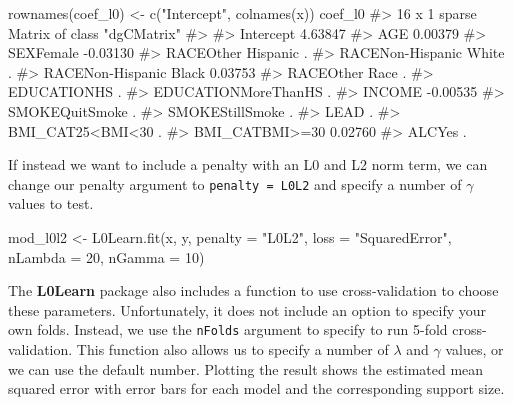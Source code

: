 \documentclass[
  letterpaper,
]{latex/krantz}
\makeatletter
\newenvironment{Shaded}{\begin{snugshade}}{\end{snugshade}}
\newcommand{\AttributeTok}[1]{\textcolor[rgb]{0.40,0.45,0.13}{#1}}
\newcommand{\CommentTok}[1]{\textcolor[rgb]{0.37,0.37,0.37}{#1}}
\newcommand{\DecValTok}[1]{\textcolor[rgb]{0.68,0.00,0.00}{#1}}
\newcommand{\FunctionTok}[1]{\textcolor[rgb]{0.28,0.35,0.67}{#1}}
\newcommand{\NormalTok}[1]{\textcolor[rgb]{0.00,0.23,0.31}{#1}}
\newcommand{\OtherTok}[1]{\textcolor[rgb]{0.00,0.23,0.31}{#1}}
\newcommand{\StringTok}[1]{\textcolor[rgb]{0.13,0.47,0.30}{#1}}
\newenvironment{kframe}{%
\medskip{}
\setlength{\fboxsep}{.8em}
 \def\at@end@of@kframe{}%
 \ifinner\ifhmode%
  \def\at@end@of@kframe{\end{minipage}}%
  \begin{minipage}{\columnwidth}%
 \fi\fi%
 \def\FrameCommand##1{\hskip\@totalleftmargin \hskip-\fboxsep
 \colorbox{shadecolor}{##1}\hskip-\fboxsep
     \hskip-\linewidth \hskip-\@totalleftmargin \hskip\columnwidth}%
 \MakeFramed {\advance\hsize-\width
   \@totalleftmargin\z@ \linewidth\hsize
   \@setminipage}}%
 {\par\unskip\endMakeFramed%
 \at@end@of@kframe}
\renewenvironment{Shaded}{\begin{kframe}}{\end{kframe}}
\makeatother
\begin{document}
\begin{Shaded}
\begin{Highlighting}[]
\FunctionTok{rownames}\NormalTok{(coef\_l0) }\OtherTok{\textless{}{-}} \FunctionTok{c}\NormalTok{(}\StringTok{"Intercept"}\NormalTok{, }\FunctionTok{colnames}\NormalTok{(x))}
\NormalTok{coef\_l0}
\CommentTok{\#\textgreater{} 16 x 1 sparse Matrix of class "dgCMatrix"}
\CommentTok{\#\textgreater{}                                }
\CommentTok{\#\textgreater{} Intercept               4.63847}
\CommentTok{\#\textgreater{} AGE                     0.00379}
\CommentTok{\#\textgreater{} SEXFemale              {-}0.03130}
\CommentTok{\#\textgreater{} RACEOther Hispanic      .      }
\CommentTok{\#\textgreater{} RACENon{-}Hispanic White  .      }
\CommentTok{\#\textgreater{} RACENon{-}Hispanic Black  0.03753}
\CommentTok{\#\textgreater{} RACEOther Race          .      }
\CommentTok{\#\textgreater{} EDUCATIONHS             .      }
\CommentTok{\#\textgreater{} EDUCATIONMoreThanHS     .      }
\CommentTok{\#\textgreater{} INCOME                 {-}0.00535}
\CommentTok{\#\textgreater{} SMOKEQuitSmoke          .      }
\CommentTok{\#\textgreater{} SMOKEStillSmoke         .      }
\CommentTok{\#\textgreater{} LEAD                    .      }
\CommentTok{\#\textgreater{} BMI\_CAT25\textless{}BMI\textless{}30        .      }
\CommentTok{\#\textgreater{} BMI\_CATBMI\textgreater{}=30          0.02760}
\CommentTok{\#\textgreater{} ALCYes                  .}
\end{Highlighting}
\end{Shaded}

If instead we want to include a penalty with an L0 and L2 norm term, we
can change our penalty argument to \texttt{penalty\ =\ L0L2} and specify
a number of \(\gamma\) values to test.

\begin{Shaded}
\begin{Highlighting}[]
\NormalTok{mod\_l0l2 }\OtherTok{\textless{}{-}} \FunctionTok{L0Learn.fit}\NormalTok{(x, y, }\AttributeTok{penalty =} \StringTok{"L0L2"}\NormalTok{, }
                        \AttributeTok{loss =} \StringTok{"SquaredError"}\NormalTok{,}
                        \AttributeTok{nLambda =} \DecValTok{20}\NormalTok{, }\AttributeTok{nGamma =} \DecValTok{10}\NormalTok{)}
\end{Highlighting}
\end{Shaded}

The \textbf{L0Learn} package also includes a function to use
cross-validation
to choose these parameters. Unfortunately, it does not include an option
to specify your own folds. Instead, we use the \texttt{nFolds} argument
to specify to run 5-fold cross-validation. This function also allows us
to specify a number of \(\lambda\) and \(\gamma\) values, or we can use
the default number. Plotting the result shows the estimated mean squared
error with error bars for each model and the corresponding support size.
\end{document}
